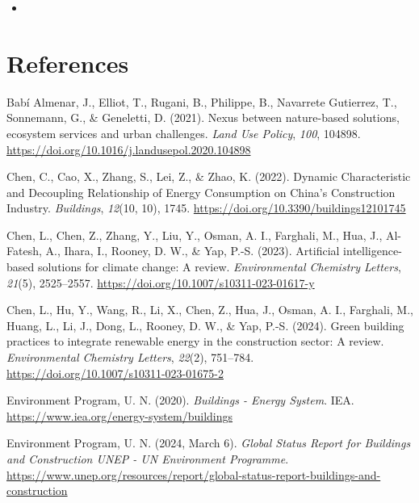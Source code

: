 \documentclass[
  letterpaper,
  DIV=11,
  numbers=noendperiod]{scrartcl}
\providecommand{\tightlist}{%
  \setlength{\itemsep}{0pt}\setlength{\parskip}{0pt}}\usepackage{longtable,booktabs,array}
\newlength{\cslhangindent}
\newenvironment{CSLReferences}[2] %
 {\begin{list}{}{%
  \setlength{\itemindent}{0pt}
  \setlength{\leftmargin}{0pt}
  \setlength{\parsep}{0pt}
  \ifodd #1
   \setlength{\leftmargin}{\cslhangindent}
   \setlength{\itemindent}{-1\cslhangindent}
  \fi
  \setlength{\itemsep}{#2\baselineskip}}}
 {\end{list}}
\begin{document}
\begin{itemize}
\tightlist
\item
\end{itemize}

\section{References}\label{references}

\label{refs}
\begin{CSLReferences}{1}{0}
Babí Almenar, J., Elliot, T., Rugani, B., Philippe, B., Navarrete
Gutierrez, T., Sonnemann, G., \& Geneletti, D. (2021). Nexus between
nature-based solutions, ecosystem services and urban challenges.
\emph{Land Use Policy}, \emph{100}, 104898.
\url{https://doi.org/10.1016/j.landusepol.2020.104898}

Chen, C., Cao, X., Zhang, S., Lei, Z., \& Zhao, K. (2022). Dynamic
{Characteristic} and {Decoupling Relationship} of {Energy Consumption}
on {China}'s {Construction Industry}. \emph{Buildings}, \emph{12}(10,
10), 1745. \url{https://doi.org/10.3390/buildings12101745}

Chen, L., Chen, Z., Zhang, Y., Liu, Y., Osman, A. I., Farghali, M., Hua,
J., Al-Fatesh, A., Ihara, I., Rooney, D. W., \& Yap, P.-S. (2023).
Artificial intelligence-based solutions for climate change: A review.
\emph{Environmental Chemistry Letters}, \emph{21}(5), 2525--2557.
\url{https://doi.org/10.1007/s10311-023-01617-y}

Chen, L., Hu, Y., Wang, R., Li, X., Chen, Z., Hua, J., Osman, A. I.,
Farghali, M., Huang, L., Li, J., Dong, L., Rooney, D. W., \& Yap, P.-S.
(2024). Green building practices to integrate renewable energy in the
construction sector: A review. \emph{Environmental Chemistry Letters},
\emph{22}(2), 751--784. \url{https://doi.org/10.1007/s10311-023-01675-2}

Environment Program, U. N. (2020). \emph{Buildings - {Energy System}}.
IEA. \url{https://www.iea.org/energy-system/buildings}

Environment Program, U. N. (2024, March 6). \emph{Global {Status Report}
for {Buildings} and {Construction} \textbar{} {UNEP} - {UN Environment
Programme}}.
\url{https://www.unep.org/resources/report/global-status-report-buildings-and-construction}


\end{CSLReferences}
\end{document}
